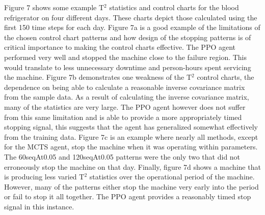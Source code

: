 \documentclass[12pt]{article}
\begin{document}
Figure 7 shows some example T$^2$ statistics and control charts for the blood refrigerator on four different days. These charts depict those calculated using the first 150 time steps for each day. Figure 7a is a good example of the limitations of the chosen
control chart patterns and how design of the stopping patterns is of critical importance
to making the control charts effective. The PPO agent performed very well and stopped the machine close to the failure region. This would translate to less unnecessary downtime and person-hours spent servicing the machine. Figure 7b demonstrates one weakness
of the T$^2$ control charts, the dependence on being able to calculate a reasonable inverse covariance matrix from the sample data. As a result of calculating the inverse covariance matrix, many of the statistics are very large. The PPO agent however does not
suffer from this same limitation and is able to provide a more appropriately timed stopping signal, this suggests that the agent has generalized somewhat effectively from the training data. Figure 7c is an example where nearly all methods, except for the MCTS
agent, stop the machine when it was operating within parameters. The 60seqAt0.05 and 120seqAt0.05 patterns were the only two that did not erroneously stop the machine on that day. Finally, figure 7d shows a machine that is producing less varied T$^2$ statistics
over the operational period of the machine. However, many of the patterns either stop the machine very early into the period or fail to stop it all together. The PPO agent provides a reasonably timed stop signal in this instance.
\end{document}
